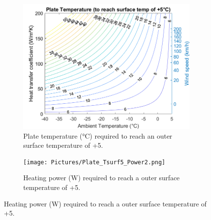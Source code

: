 %

\begin{figure}[ht]
\centering
\begin{minipage}[b]{0.48\linewidth}
\begin{figure} [H]
	\centering
	\includegraphics[scale=0.55]{Pictures/Plate_Tsurf5_PlateTemp.png}
	\caption[Heating Plate - Plate Temperature Graph]{Plate temperature (°C) required to reach an outer surface temperature of +5\dC.}
	\label{fig:PlateTemp}
\end{figure}

\label{fig:minipage1}
\end{minipage}
\quad
\begin{minipage}[b]{0.48\linewidth}
\begin{figure} [H]
	\centering
	\texttt{[image: Pictures/Plate\_Tsurf5\_Power2.png]}
	\caption[Heating Plate - Heating Power Graph]{Heating power (W) required to reach a outer surface temperature of +5\dC.}
	\label{fig:PlatePower}
\end{figure}
\label{fig:minipage2}
\end{minipage}
\end{figure}

